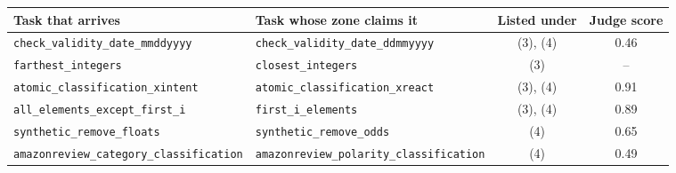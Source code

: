 \scriptsize\begin{tabular}{llcc}
    \toprule
    Task that arrives & Task whose zone claims it & Listed under & Judge score \\
    \midrule
    \texttt{check\_validity\_date\_mmddyyyy} & \texttt{check\_validity\_date\_ddmmyyyy} & (3), (4) & 0.46 \\
    \texttt{farthest\_integers} & \texttt{closest\_integers} & (3) & -- \\
    \texttt{atomic\_classification\_xintent} & \texttt{atomic\_classification\_xreact} & (3), (4) & 0.91 \\
    \texttt{all\_elements\_except\_first\_i} & \texttt{first\_i\_elements} & (3), (4) & 0.89 \\
    \texttt{synthetic\_remove\_floats} & \texttt{synthetic\_remove\_odds} & (4) & 0.65 \\
    \texttt{amazonreview\_category\_classification} & \texttt{amazonreview\_polarity\_classification} & (4) & 0.49 \\
    \bottomrule
\end{tabular}
